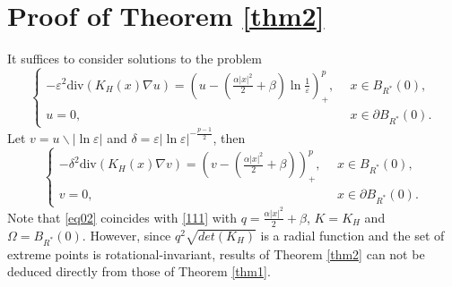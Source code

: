 \documentclass[12pt,reqno]{amsart}
\numberwithin{equation}{section}
\theoremstyle{definition}
\theoremstyle{remark}
\begin{document}
\section{Proof of Theorem \ref{thm2}}
It suffices to consider solutions to the problem
\begin{equation}\label{eq01}
\begin{cases}
-\varepsilon^2\text{div}(K_H(x)\nabla u)=  \left(u-\left( \frac{\alpha|x|^2}{2}+\beta\right)\ln\frac{1}{\varepsilon}\right)^{p}_+,\ \ &x\in B_{R^*}(0),\\
u=0,\ \ &x\in\partial  B_{R^*}(0).
\end{cases}
\end{equation}
Let $ v=u\backslash|\ln\varepsilon|  $ and $ \delta=\varepsilon|\ln\varepsilon|^{-\frac{p-1}{2}} $, then
\begin{equation}\label{eq02}
\begin{cases}
-\delta^2\text{div}(K_H(x)\nabla v)=  \left( v-\left( \frac{\alpha|x|^2}{2}+\beta\right) \right)^{p}_+,\ \ &x\in B_{R^*}(0),\\
v=0,\ \ &x\in\partial  B_{R^*}(0).
\end{cases}
\end{equation}
Note that \eqref{eq02} coincides with \eqref{111} with $ q=\frac{\alpha|x|^2}{2}+\beta $, $ K=K_H $ and $ \Omega=B_{R^*}(0) $. However,  since $ q^2\sqrt{det(K_H)} $ is a radial function and the set of  extreme points is rotational-invariant, results of Theorem \ref{thm2} can not be deduced directly from those of Theorem \ref{thm1}. %

\end{document}
